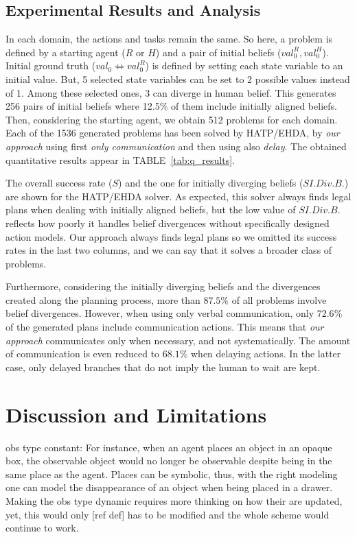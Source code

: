 {\subsection{Experimental Results and Analysis}

In each domain, the actions and tasks remain the same. So here, a problem is defined by a starting agent ($R$ or $H$) and a pair of initial beliefs ($val^R_0, val^H_ 0$).
Initial ground truth ($val_0 \Leftrightarrow val^R_0$) is defined by setting each state variable to an initial value. But, 5 selected state variables can be set to 2 possible values instead of 1. Among these selected ones, 3 can diverge in human belief. This generates 256 pairs of initial beliefs where 12.5\% of them include initially aligned beliefs. Then, considering the starting agent, we obtain 512 problems for each domain. 
Each of the 1536 generated problems has been solved by HATP/EHDA, by \textit{our approach} using first \textit{only communication} and then using also \textit{delay}.
The obtained quantitative results appear in TABLE~\ref{tab:q_results}.
 
The overall success rate ($S$) and the one for initially diverging beliefs ($S I.Div.B.$) are shown for the HATP/EHDA solver. As expected, this solver always finds legal plans when dealing with initially aligned beliefs, but the low value of $S I.Div.B.$ reflects how poorly it handles belief divergences without specifically designed action models.
Our approach always finds legal plans so we omitted its success rates in the last two columns, and we can say that it solves a broader class of problems.

Furthermore, considering the initially diverging beliefs and the divergences created along the planning process, more than $87.5\%$ of all problems involve belief divergences. 
However, when using only verbal communication, only $72.6\%$ of the generated plans include communication actions.
This means that \textit{our approach} communicates only when necessary, and not systematically. 
The amount of communication is even reduced to $68.1\%$ when delaying actions. In the latter case, only delayed branches that do not imply the human to wait are kept. 

\section{Discussion and Limitations}


obs type constant: For instance, when an agent places an object in an opaque box, the observable object would no longer be observable despite being in the same place as the agent. Places can be symbolic, thus, with the right modeling one can model the disappearance of an object when being placed in a drawer. Making the obs type dynamic requires more thinking on how their are updated, yet, this would only [ref def] has to be modified and the whole scheme would continue to work.

}
